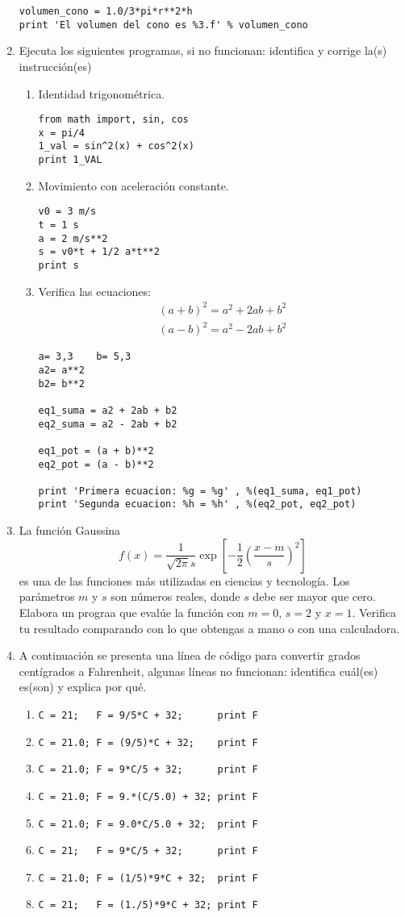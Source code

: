 \documentclass[12pt]{article}
\begin{document}
\begin{enumerate}
\begin{verbatim}
volumen_cono = 1.0/3*pi*r**2*h
print 'El volumen del cono es %3.f' % volumen_cono
\end{verbatim}
\item Ejecuta los siguientes programas, si no funcionan: identifica y corrige la(s) instrucción(es)
\begin{enumerate}
\item Identidad trigonométrica.
\begin{verbatim}
from math import, sin, cos
x = pi/4
1_val = sin^2(x) + cos^2(x)
print 1_VAL
\end{verbatim}
\item Movimiento con aceleración constante.
\begin{verbatim}
v0 = 3 m/s
t = 1 s
a = 2 m/s**2
s = v0*t + 1/2 a*t**2
print s
\end{verbatim}
\item Verifica las ecuaciones:
\begin{eqnarray*}
(a+b)^{2} = a^{2} + 2ab + b^{2} \\
(a-b)^{2} = a^{2} - 2ab + b^{2}
\end{eqnarray*}
\begin{verbatim}
a= 3,3    b= 5,3
a2= a**2
b2= b**2

eq1_suma = a2 + 2ab + b2
eq2_suma = a2 - 2ab + b2

eq1_pot = (a + b)**2
eq2_pot = (a - b)**2

print 'Primera ecuacion: %g = %g' , %(eq1_suma, eq1_pot)
print 'Segunda ecuacion: %h = %h' , %(eq2_pot, eq2_pot)
\end{verbatim}
\end{enumerate}
\item La función Gaussina
\[ f(x) = \dfrac{1}{\sqrt{2\pi}s} \exp	\left[ - \dfrac{1}{2} \left( \dfrac{x-m}{s} \right)^{2} \right] \]
es una de las funciones más utilizadas en ciencias y tecnología. Los parámetros $m$ y $s$ son números reales, donde $s$ debe ser mayor que cero. Elabora un prograa que evalúe la función con $m=0$, $s=2$ y $x=1$. Verifica tu resultado comparando con lo que obtengas a mano o con una calculadora.
\item A continuación se presenta una línea de código para convertir grados centígrados a Fahrenheit, algunas líneas no funcionan: identifica cuál(es) es(son) y explica por qué.
\begin{enumerate}
\item \verb|C = 21;   F = 9/5*C + 32;      print F |
\item \verb|C = 21.0; F = (9/5)*C + 32;    print F|
\item \verb|C = 21.0; F = 9*C/5 + 32;      print F|
\item \verb|C = 21.0; F = 9.*(C/5.0) + 32; print F|
\item \verb|C = 21.0; F = 9.0*C/5.0 + 32;  print F|
\item \verb|C = 21;   F = 9*C/5 + 32;      print F|
\item \verb|C = 21.0; F = (1/5)*9*C + 32;  print F|
\item \verb|C = 21;   F = (1./5)*9*C + 32; print F|
\end{enumerate}
\end{enumerate}
\end{document}
